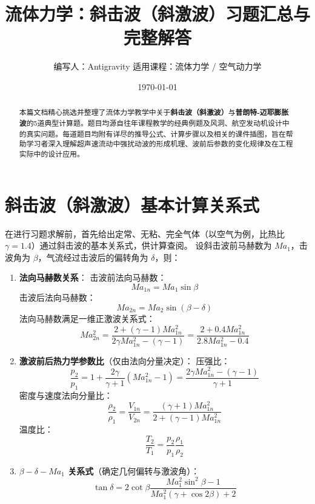 \documentclass[11pt,a4paper]{ctexart}
\title{\Huge \textbf{流体力学：斜击波（斜激波）习题汇总与完整解答}}
\author{\large 编写人：Antigravity \quad 适用课程：流体力学 / 空气动力学}
\date{\today}
\begin{document}
\maketitle

\begin{abstract}
本篇文档精心挑选并整理了流体力学教学中关于\textbf{斜击波（斜激波）}与\textbf{普朗特-迈耶膨胀波}的5道典型计算题。题目均源自往年课程教学的经典例题及风洞、航空发动机设计中的真实问题。每道题目均附有详尽的推导公式、计算步骤以及相关的课件插图，旨在帮助学习者深入理解超声速流动中强扰动波的形成机理、波前后参数的变化规律及在工程实际中的设计应用。
\end{abstract}

\tableofcontents
\newpage

\section{斜击波（斜激波）基本计算关系式}
在进行习题求解前，首先给出定常、无粘、完全气体（以空气为例，比热比 $\gamma = 1.4$）通过斜击波的基本关系式，供计算查阅。
设斜击波前马赫数为 $Ma_1$，击波角为 $\beta$，气流经过击波后的偏转角为 $\delta$，则：
\begin{enumerate}
    \item \textbf{法向马赫数关系}：
    击波前法向马赫数：
    \begin{equation}
        Ma_{1n} = Ma_1 \sin \beta
    \end{equation}
    击波后法向马赫数：
    \begin{equation}
        Ma_{2n} = Ma_2 \sin (\beta - \delta)
    \end{equation}
    法向马赫数满足一维正激波关系式：
    \begin{equation}
        Ma_{2n}^2 = \frac{2 + (\gamma - 1)Ma_{1n}^2}{2\gamma Ma_{1n}^2 - (\gamma - 1)} = \frac{2 + 0.4 Ma_{1n}^2}{2.8 Ma_{1n}^2 - 0.4}
    \end{equation}
    
    \item \textbf{激波前后热力学参数比}（仅由法向分量决定）：
    压强比：
    \begin{equation}
        \frac{p_2}{p_1} = 1 + \frac{2\gamma}{\gamma+1}(Ma_{1n}^2 - 1) = \frac{2\gamma Ma_{1n}^2 - (\gamma - 1)}{\gamma+1}
    \end{equation}
    密度与速度法向分量比：
    \begin{equation}
        \frac{\rho_2}{\rho_1} = \frac{V_{1n}}{V_{2n}} = \frac{(\gamma+1)Ma_{1n}^2}{2 + (\gamma-1)Ma_{1n}^2}
    \end{equation}
    温度比：
    \begin{equation}
        \frac{T_2}{T_1} = \frac{p_2}{p_1} \frac{\rho_1}{\rho_2}
    \end{equation}
    
    \item \textbf{$\beta-\delta-Ma_1$ 关系式}（确定几何偏转与激波角）：
    \begin{equation}
        \tan \delta = 2 \cot \beta \frac{Ma_1^2 \sin^2 \beta - 1}{Ma_1^2 (\gamma + \cos 2\beta) + 2}
    \end{equation}
\end{enumerate}
\end{document}
